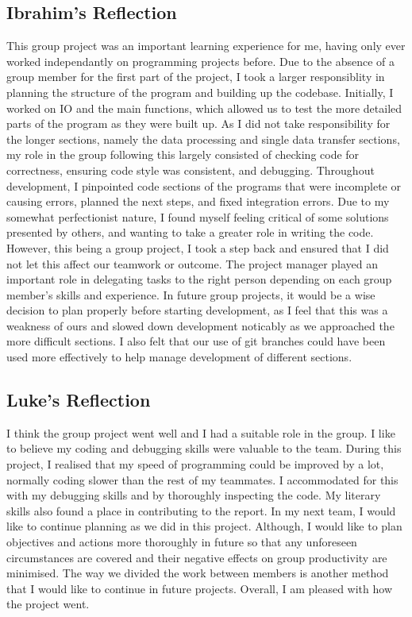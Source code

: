 \documentclass[11pt]{article}
\begin{document}
\subsection{Ibrahim's Reflection}
This group project was an important learning experience for me, having only ever worked independantly on programming projects before. Due to the absence of a group member for the first part of the project, I took a larger responsiblity in planning the structure of the program and building up the codebase. Initially, I worked on IO and the main functions, which allowed us to test the more detailed parts of the program as they were built up. As I did not take responsibility for the longer sections, namely the data processing and single data transfer sections, my role in the group following this largely consisted of checking code for correctness, ensuring code style was consistent, and debugging. Throughout development, I pinpointed code sections of the programs that were incomplete or causing errors, planned the next steps, and fixed integration errors. Due to my somewhat perfectionist nature, I found myself feeling critical of some solutions presented by others, and wanting to take a greater role in writing the code. However, this being a group project, I took a step back and ensured that I did not let this affect our teamwork or outcome. The project manager played an important role in delegating tasks to the right person depending on each group member's skills and experience. In future group projects, it would be a wise decision to plan properly before starting development, as I feel that this was a weakness of ours and slowed down development noticably as we approached the more difficult sections. I also felt that our use of git branches could have been used more effectively to help manage development of different sections.

\subsection{Luke's Reflection}
I think the group project went well and I had a suitable role in the group.
I like to believe my coding and debugging skills were valuable to the team.
During this project, I realised that my speed of programming could be improved by a lot,
normally coding slower than the rest of my teammates. I accommodated for this
with my debugging skills and by thoroughly inspecting the code.
My literary skills also found a place in contributing to the report.
In my next team, I would like to continue planning as we did in this project.
Although, I would like to plan objectives and actions more thoroughly in future so that
any unforeseen circumstances are covered and their negative effects on group productivity are minimised. The way we divided the work between members is another
method that I would like to continue in future projects.
Overall, I am pleased with how the project went.
\end{document}
